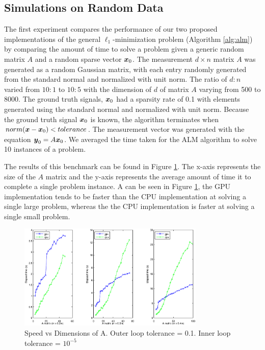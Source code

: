 \documentclass[10pt,twocolumn,letterpaper]{article}
\begin{document}
\subsection{Simulations on Random Data}
\label{sec:simulation}

The first experiment compares the performance of our two proposed implementations of 
the general $\ell_1$-minimization problem (Algorithm \eqref{alg:alm}) by
comparing the amount of time to solve a problem given a generic random matrix $A$ and a random sparse
vector ${\boldsymbol{x}}_0$.  
The measurement $d \times n$ matrix $A$ was generated as a random Gaussian matrix, with each entry
randomly generated from the standard normal and normalized with unit norm.  The ratio of $d:n$ varied from
$10:1$ to $10:5$ with the dimension of $d$ of matrix $A$ varying from 500 to 8000.
The ground truth signals, ${\boldsymbol{x}}_0$ had a sparsity rate of 0.1 with elements generated using the standard normal and normalized with unit norm.
Because the ground truth signal ${\boldsymbol{x}}_0$ is known, the algorithm terminates
when $norm({\boldsymbol x}-{\boldsymbol x}_0) < tolerance$.
The measurement vector was generated with the equation $\boldsymbol{y}_0 = A {\boldsymbol{x}}_0$.   
We averaged the time taken for the ALM algorithm to solve 10 instances of a problem.  

The results of this benchmark can be found in Figure \ref{fig:random_data}.
The x-axis represents the size of the $A$ matrix and the y-axis represents the
average amount of time it to complete a single problem instance.  A can be seen
in Figure \ref{fig:random_data}, the GPU implementation tends to be faster than
the CPU implementation at solving a single large problem, whereas the the CPU
implementation is faster at solving a single small problem.  
\begin{figure}
\begin{center}
\includegraphics[width=3.5in]{results/random_data/time_vs_matrix_size_constant_tol}
\end{center}
\caption{Speed vs Dimensions of A.  Outer loop tolerance = 0.1.  Inner loop tolerance = $10^{-5}$}
\label{fig:random_data}
\end{figure}
\end{document}

